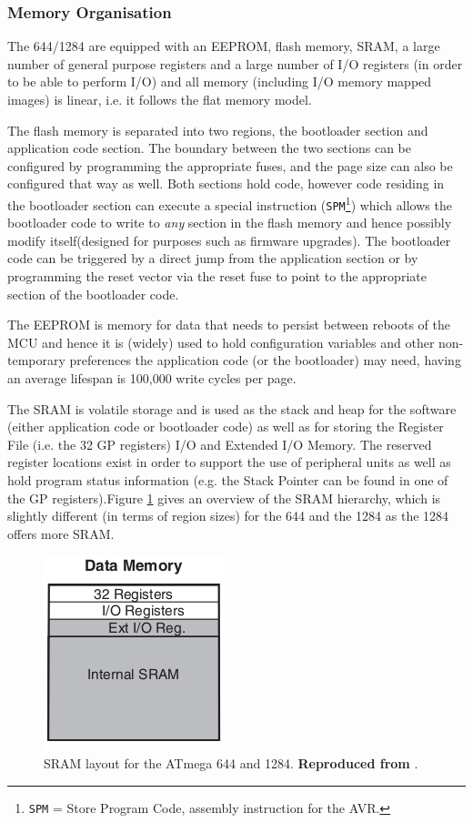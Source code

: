 	\subsubsection{Memory Organisation}
	The 644/1284 are equipped with an EEPROM, flash memory, SRAM, a large number of general purpose registers and a large number of I/O registers (in order to be able to perform I/O) and all memory (including I/O memory mapped images) is linear, i.e. it follows the flat memory model.
	
	The flash memory is separated into two regions, the bootloader section and application code section. The boundary between the two sections can be configured by programming the appropriate fuses, and the page size can also be configured that way as well. Both sections hold code, however code residing in the bootloader section can execute a special instruction (\texttt{SPM}\footnote{\texttt{SPM} = Store Program Code, assembly instruction for the AVR.}) which allows the bootloader code to write to \textit{any} section in the flash memory and hence possibly modify itself(designed for purposes such as firmware upgrades). The bootloader code can be triggered by a direct jump from the application section or by programming the reset vector via the reset fuse to point to the appropriate section of the bootloader code. 
	
	The EEPROM is memory for data that needs to persist between reboots of the MCU and hence it is (widely) used to hold configuration variables and other non-temporary preferences the application code (or the bootloader) may need, having an average lifespan is 100,000 write cycles per page. 
	
	The SRAM is volatile storage and is used as the stack and heap for the software (either application code or bootloader code) as well as for storing the Register File (i.e. the 32 GP registers) I/O and Extended I/O Memory. The reserved register locations exist in order to support the use of peripheral units as well as hold program status information (e.g. the Stack Pointer can be found in one of the GP registers).Figure \ref{fig:stack} gives an overview of the SRAM hierarchy, which is slightly different (in terms of region sizes) for the 644 and the 1284 as the 1284 offers more SRAM.
	
	\begin{figure}
		\includegraphics[scale=0.7]{img/stack.png}
		\caption{SRAM layout for the ATmega 644 and 1284. \textbf{Reproduced from} \protect\citep{atmega_manual}.}
		\label{fig:stack}		
	\end{figure}
	
